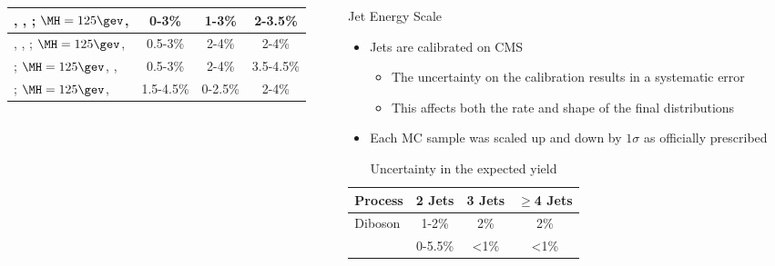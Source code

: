 \begin{frame}
\begin{columns}[T]
\begin{column}{0.48\textwidth}
\begin{table}[htbp]
\begin{center}
\begin{tabular}{|p{2.5cm}|c|c|c|}
					\WH, \ZH, \ttH; \newline $\MH=\text{125}\gev$, \HWW & 0-3\%     & 1-3\%   & 2-3.5\%   \\\hline
					\WH, \ZH, \ttH; \newline $\MH=\text{125}\gev$, \HZZ & 0.5-3\%   & 2-4\%   & 2-4\%     \\
					\WH; $\MH=\text{125}\gev$, \newline \Hbb, \Wlv      & 0.5-3\%   & 2-4\%   & 3.5-4.5\% \\
					\ttH; $\MH=\text{125}\gev$, \Hbb           & 1.5-4.5\% & 0-2.5\% & 2-4\%     \\\hline
				\end{tabular}
			\end{center}
			\end{table}
		\end{column}
		\begin{column}{0.48\textwidth}
			\begin{block}{Jet Energy Scale}
				\begin{itemize}
					\footnotesize
					\item Jets are calibrated on CMS
					\begin{itemize}
						\footnotesize
						\item The uncertainty on the calibration results in a systematic error
						\item This affects both the rate and shape of the final distributions
					\end{itemize}
					\item Each MC sample was scaled up and down by $1\sigma$ as officially prescribed
				\end{itemize}
			\end{block}
			\vspace*{-0.65cm}
			\begin{table}[htbp]
			\begin{center}
			  	\tiny
			    \captionsetup{width=.85\textwidth}
			    \caption{Uncertainty in the expected yield}
			    \vspace*{-0.4cm}
			    \label{tab:JESWeightSys}
			    \begin{tabular}{|p{2.5cm}|c|c|c|} \hline
					Process                                    & 2 Jets  & 3 Jets  & $\geqslant$4 Jets \\\hline
					Diboson                                    & 1-2\%   & 2\%     & 2\%     \\
					\Zjets                                     & 0-5.5\% & <1\%    & <1\%    \\

\end{tabular}
\end{center}
\end{table}
\end{column}
\end{columns}
\end{frame}
